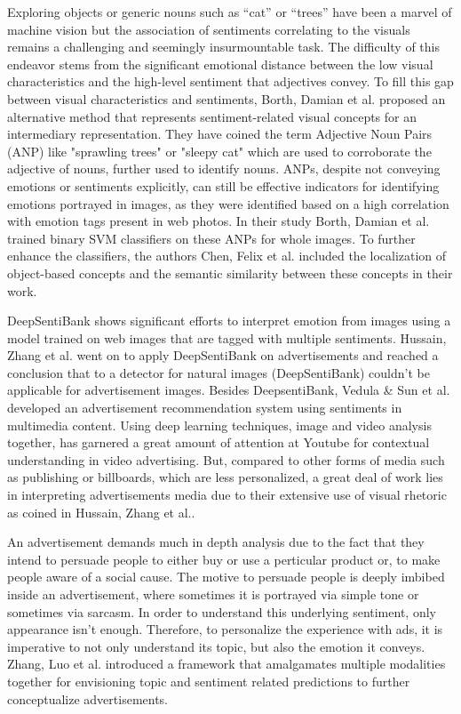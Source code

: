 \documentclass[conference]{IEEEtran}
\begin{document}
Exploring objects or generic nouns such as “cat” or “trees” have been a marvel of 
machine vision but the association of sentiments correlating to the visuals remains 
a challenging and seemingly insurmountable task. The difficulty of this endeavor 
stems from the significant emotional distance between the low visual characteristics 
and the high-level sentiment that adjectives convey. To fill this gap between visual 
characteristics and sentiments, Borth, Damian et al.\cite{b8} proposed an alternative 
method that represents sentiment-related visual concepts for an intermediary 
representation. They have coined the term Adjective Noun Pairs (ANP) like "sprawling trees" 
or "sleepy cat" which are used to corroborate the adjective of nouns, further used to 
identify nouns. ANPs, despite not conveying emotions or sentiments explicitly, can 
still be effective indicators for identifying emotions portrayed in images, as they 
were identified based on a high correlation with emotion tags present in web photos. 
In their study Borth, Damian et al.\cite{b8} trained binary SVM classifiers on these 
ANPs for whole images. To further enhance the classifiers, the authors Chen, Felix 
et al.\cite{b9} included the localization of object-based concepts and the semantic 
similarity between these concepts in their work.

DeepSentiBank\cite{b10} shows significant efforts to interpret emotion from images 
using a model trained on web images that are tagged with multiple sentiments. Hussain, 
Zhang et al.\cite{b11} went on to apply DeepSentiBank on advertisements and reached a conclusion 
that to a detector for natural images (DeepSentiBank) couldn't be applicable for 
advertisement images. Besides DeepsentiBank, Vedula \& Sun et al.\cite{b12} developed 
an advertisement recommendation system using sentiments in multimedia content. Using 
deep learning techniques, image and video analysis together, has garnered a great 
amount of attention at Youtube for contextual understanding in video advertising\cite{b13}. 
But, compared to other forms of media such as publishing 
or billboards, which are less personalized, a great deal of work lies in interpreting 
advertisements media due to their extensive use of visual rhetoric as coined in 
Hussain, Zhang et al.\cite{b11}. 

An advertisement demands much in depth analysis due to the fact that they intend to 
persuade people to either buy or use a perticular product or, to make people aware 
of a social cause. The motive to persuade people is deeply imbibed 
inside an advertisement, where sometimes it is portrayed via simple tone or sometimes 
via sarcasm. In order to understand this underlying sentiment, only appearance isn't 
enough. Therefore, to personalize the experience with ads, it is imperative to not 
only understand its topic, but also the emotion it conveys. Zhang, Luo et al.\cite{b14} 
introduced a framework that amalgamates multiple modalities together for envisioning 
topic and sentiment related predictions to further conceptualize advertisements.
\end{document}
